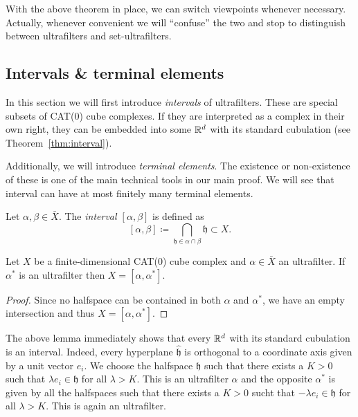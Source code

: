 \begin{rem}
  With the above theorem in place, we can switch viewpoints whenever necessary. Actually, whenever convenient we will \enquote{confuse} the two and stop to distinguish between ultrafilters and set-ultrafilters.
\end{rem}

\subsection{Intervals \& terminal elements}
\label{sec:terminal-elements}

In this section we will first introduce \emph{intervals} of ultrafilters. These are special subsets of CAT(0) cube complexes. If they are interpreted as a complex in their own right, they can be embedded into some \(\mathbb{R}^d\) with its standard cubulation (see Theorem~\ref{thm:interval}).

Additionally, we will introduce \emph{terminal elements}. The existence or non-existence of these is one of the main technical tools in our main proof. We will see that interval can have at most finitely many terminal elements.

\begin{defin}
  \label{defin:uf-interval}
  Let \(\alpha,\beta \in \bar X\). The \emph{interval \([\alpha,\beta]\)} is defined as
  \[
    [\alpha,\beta] \coloneqq \bigcap_{\mathfrak{h} \in \alpha \cap \beta} \mathfrak{h} \subset X.
  \]
\end{defin}

\begin{lemma}
  \label{lem:x-interval}
  Let \(X\) be a finite-dimensional CAT(0) cube complex and \(\alpha \in \bar X\) an ultrafilter. If \(\alpha^\ast\) is an ultrafilter then \(X = [\alpha, \alpha^\ast]\).
\end{lemma}

\begin{proof}
  Since no halfspace can be contained in both \(\alpha\) and \(\alpha^\ast\), we have an empty intersection and thus \(X = [\alpha, \alpha^\ast]\).
\end{proof}

\begin{bsp}
  \label{bsp:euclidean-interval}
  The above lemma immediately shows that every \(\mathbb{R}^d\) with its standard cubulation is an interval. Indeed, every hyperplane \(\mathfrak{\hat h}\) is orthogonal to a coordinate axis given by a unit vector \(e_i\). We choose the halfspace \(\mathfrak{h}\) such that there exists a \(K>0\) such that \(\lambda e_i \in \mathfrak{h}\) for all \(\lambda > K\). This is an ultrafilter \(\alpha\) and the opposite \(\alpha^\ast\) is given by all the halfspaces such that there exists a \(K > 0\) sucht that \(-\lambda e_i \in \mathfrak{h}\) for all \(\lambda > K\). This is again an ultrafilter. 
\end{bsp}

